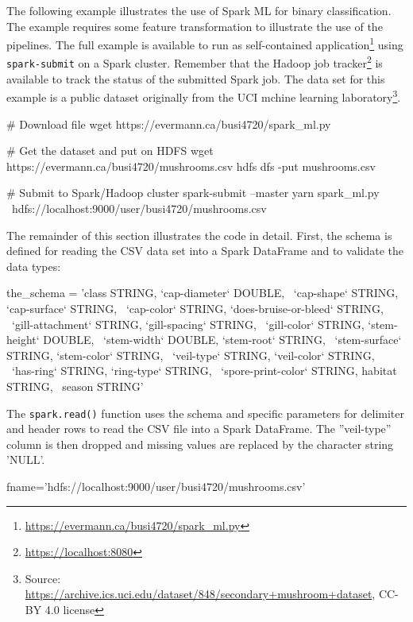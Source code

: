 \begin{withcode}
The following example illustrates the use of Spark ML for binary classification. The example requires some feature transformation to illustrate the use of the pipelines. The full example is available to run as self-contained application\footnote{\url{https://evermann.ca/busi4720/spark_ml.py}} using \texttt{spark-submit} on a Spark cluster. Remember that the Hadoop job tracker\footnote{\url{https://localhost:8080}} is available to track the status of the submitted Spark job. The data set for this example is a public dataset originally from the UCI mchine learning laboratory\footnote{Source: \url{https://archive.ics.uci.edu/dataset/848/secondary+mushroom+dataset}, CC-BY 4.0 license}.

\begin{bashcode}
# Download file
wget https://evermann.ca/busi4720/spark_ml.py

# Get the dataset and put on HDFS
wget https://evermann.ca/busi4720/mushrooms.csv
hdfs dfs -put mushrooms.csv

# Submit to Spark/Hadoop cluster
spark-submit --master yarn spark_ml.py \
    hdfs://localhost:9000/user/busi4720/mushrooms.csv
\end{bashcode}

The remainder of this section illustrates the code in detail. First, the schema is defined for reading the CSV data set into a Spark DataFrame and to validate the data types:

\begin{pythoncode}
the_schema = 'class STRING, `cap-diameter` DOUBLE, \
    `cap-shape` STRING, `cap-surface` STRING, \
    `cap-color` STRING, `does-bruise-or-bleed` STRING, \
    `gill-attachment` STRING, `gill-spacing` STRING, \
    `gill-color` STRING, `stem-height` DOUBLE, \
    `stem-width` DOUBLE, `stem-root` STRING, \
    `stem-surface` STRING, `stem-color` STRING, \
    `veil-type` STRING, `veil-color` STRING, \
    `has-ring` STRING, `ring-type` STRING, \
    `spore-print-color` STRING, habitat STRING, \
    season STRING'
\end{pythoncode}

The \texttt{spark.read()} function uses the schema and specific parameters for delimiter and header rows to read the CSV file into a Spark DataFrame. The ''veil-type'' column is then dropped and missing values are replaced by the character string 'NULL'.

\begin{pythoncode}
fname='hdfs://localhost:9000/user/busi4720/mushrooms.csv'


\end{pythoncode}
\end{withcode}
